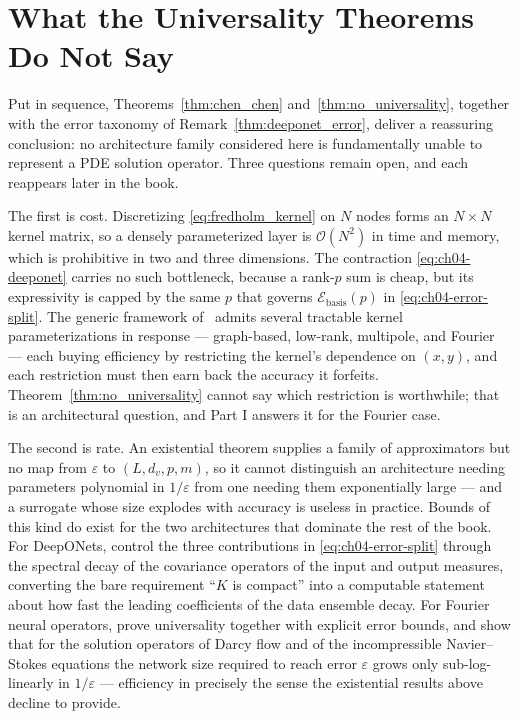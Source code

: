 \section{What the Universality Theorems Do Not Say}

Put in sequence, Theorems~\ref{thm:chen_chen} and~\ref{thm:no_universality}, together with the error taxonomy of Remark~\ref{thm:deeponet_error}, deliver a reassuring conclusion: no architecture family considered here is fundamentally unable to represent a PDE solution operator. Three questions remain open, and each reappears later in the book.

The first is cost. Discretizing \eqref{eq:fredholm_kernel} on $N$ nodes forms an $N\times N$ kernel matrix, so a densely parameterized layer is $\mathcal{O}(N^{2})$ in time and memory, which is prohibitive in two and three dimensions. The contraction \eqref{eq:ch04-deeponet} carries no such bottleneck, because a rank-$p$ sum is cheap, but its expressivity is capped by the same $p$ that governs $\mathcal{E}_{\text{basis}}(p)$ in \eqref{eq:ch04-error-split}. The generic framework of~\cite{kovachki2023neural} admits several tractable kernel parameterizations in response --- graph-based, low-rank, multipole, and Fourier~\cite{li2021fourier} --- each buying efficiency by restricting the kernel's dependence on $(x,y)$, and each restriction must then earn back the accuracy it forfeits. Theorem~\ref{thm:no_universality} cannot say which restriction is worthwhile; that is an architectural question, and Part I answers it for the Fourier case.

The second is rate. An existential theorem supplies a family of approximators but no map from $\varepsilon$ to $(L,d_{v},p,m)$, so it cannot distinguish an architecture needing parameters polynomial in $1/\varepsilon$ from one needing them exponentially large --- and a surrogate whose size explodes with accuracy is useless in practice. Bounds of this kind do exist for the two architectures that dominate the rest of the book. For DeepONets, \cite{lanthaler2022error} control the three contributions in \eqref{eq:ch04-error-split} through the spectral decay of the covariance operators of the input and output measures, converting the bare requirement ``$K$ is compact'' into a computable statement about how fast the leading coefficients of the data ensemble decay. For Fourier neural operators, \cite{kovachki2021universal} prove universality together with explicit error bounds, and show that for the solution operators of Darcy flow and of the incompressible Navier--Stokes equations the network size required to reach error $\varepsilon$ grows only sub-log-linearly in $1/\varepsilon$ --- efficiency in precisely the sense the existential results above decline to provide.

